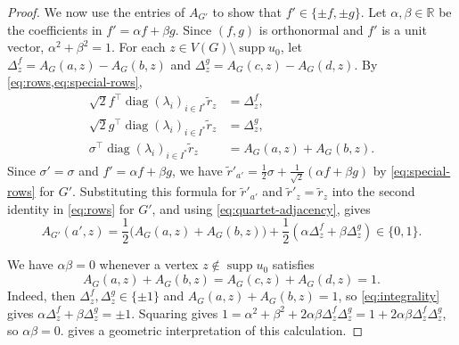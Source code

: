 \documentclass[11pt,a4paper]{article}
\theoremstyle{plain}
\theoremstyle{definition}
\DeclareMathOperator{\supp}{supp}
\DeclareMathOperator{\diag}{diag}
\newcommand{\R}{\mathbb{R}}
\begin{document}
\begin{proof}
  We now use the entries of $A_{G'}$ to show that $f'\in\{\pm f,\pm g\}$.
  Let $\alpha,\beta\in\R$ be the coefficients in $f'=\alpha f+\beta g$.
  Since $(f,g)$ is orthonormal and $f'$ is a unit vector,
  $\alpha^2+\beta^2=1$.
  For each $z\in V(G)\setminus\supp u_0$, let
  $\Delta_z^f=A_G(a,z)-A_G(b,z)$ and
  $\Delta_z^g=A_G(c,z)-A_G(d,z)$.
  By \cref{eq:rows,eq:special-rows},
  \begin{equation}\label{eq:quartet-adjacency}
    \begin{aligned}
      \sqrt2 f^{\top}\diag(\lambda_i)_{i\in I^*}\tilde{r}_z &= \Delta_z^f,\\
      \sqrt2 g^{\top}\diag(\lambda_i)_{i\in I^*}\tilde{r}_z &= \Delta_z^g,\\
      \sigma^{\top}\diag(\lambda_i)_{i\in I^*}\tilde{r}_z &= A_G(a,z)+A_G(b,z).
    \end{aligned}
  \end{equation}
  Since $\sigma'=\sigma$ and $f'=\alpha f+\beta g$, we have
  $\tilde{r}'_{a'}=\tfrac12\sigma+\tfrac1{\sqrt2}(\alpha f+\beta g)$
  by \cref{eq:special-rows} for $G'$.
  Substituting this formula for $\tilde{r}'_{a'}$ and $\tilde{r}'_z=\tilde{r}_z$ into
  the second identity in \cref{eq:rows} for $G'$, and using
  \cref{eq:quartet-adjacency}, gives
  \begin{equation}
    \label{eq:integrality}
    A_{G'}(a', z) = \frac{1}{2}\bigl(A_G(a,z)+A_G(b,z)\bigr)
      + \frac{1}{2}(\alpha\Delta_z^f+\beta\Delta_z^g)\in\{0,1\}.
  \end{equation}

  We have $\alpha\beta=0$ whenever a vertex $z\notin\supp u_0$ satisfies
  \begin{equation}\label{eq:quartet-probe}
    A_G(a,z)+A_G(b,z)=A_G(c,z)+A_G(d,z)=1.
  \end{equation}
  Indeed, then $\Delta_z^f,\Delta_z^g\in\{\pm1\}$ and
  $A_G(a,z)+A_G(b,z)=1$, so \cref{eq:integrality} gives
  $\alpha\Delta_z^f+\beta\Delta_z^g=\pm1$.
  Squaring gives
  $1=\alpha^2+\beta^2+2\alpha\beta\Delta_z^f\Delta_z^g
  =1+2\alpha\beta\Delta_z^f\Delta_z^g$, so $\alpha\beta=0$.
   gives a geometric interpretation of this calculation.


\end{proof}
\end{document}
